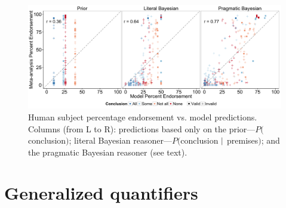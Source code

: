 \documentclass[10pt,letterpaper]{article}
\begin{document}

\begin{figure}[t!] %
\centering
	\subfigure
		\centering
  \includegraphics[width=\textwidth]{multiScatter_fig2}
  \caption{Human subject percentage endorsement vs. model predictions.
  Columns (from L to R): predictions based only on the prior---$P($conclusion$)$; literal Bayesian reasoner---$P($conclusion $\arrowvert$ premises$)$; and the pragmatic Bayesian reasoner (see text).}
  \label{fig:megaScatter}

\end{figure}






\section{Generalized quantifiers}
\end{document}

